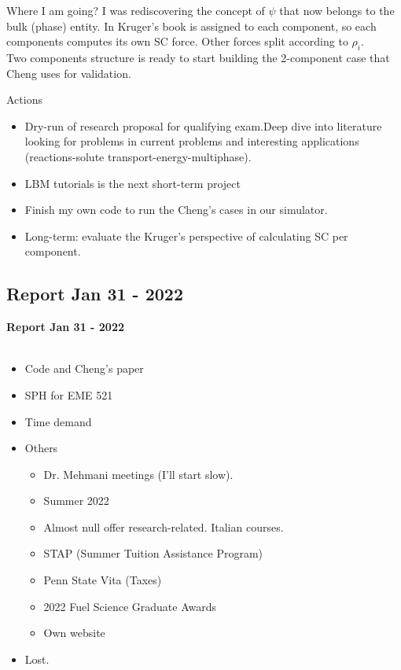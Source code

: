 \documentclass[8pt]{beamer}
\begin{document}
	\begin{frame}{Where I am going?}
		I was rediscovering the concept of $\psi$ that now belongs to the bulk (phase) entity. In Kruger's book is assigned to each component, so each components computes its own SC force. Other forces split according to $\rho_i$.\\
		Two components structure is ready to start building the 2-component case that Cheng uses for validation. 
	\end{frame}
	\begin{frame}{Actions}
		\begin{itemize}
			\item Dry-run of research proposal for qualifying exam.Deep dive into literature looking for problems in current problems and interesting applications (reactions-solute transport-energy-multiphase).
			\item LBM tutorials is the next short-term project
			\item Finish my own code to run the Cheng's cases in our simulator. 
			\item Long-term: evaluate the Kruger's perspective of calculating SC per component.
		\end{itemize}
	\end{frame}
	
	\subsection{Report Jan 31 - 2022}
	\label{}
	\justifying
	\begin{frame}
		\textbf{Report Jan 31 - 2022}\\~\\
		\begin{itemize}
			\item Code and Cheng's paper
			\item SPH for EME 521
			\item Time demand
			\item Others
			\begin{itemize}
				\item Dr. Mehmani meetings (I'll start slow). 
				\item Summer 2022
				\item Almost null offer research-related. Italian courses.
				\item STAP (Summer Tuition Assistance Program)
				\item Penn State Vita (Taxes)
				\item 2022 Fuel Science Graduate Awards
				\item Own website
			\end{itemize}
			\item Lost.
		\end{itemize}
	\end{frame}
	
\end{document}
